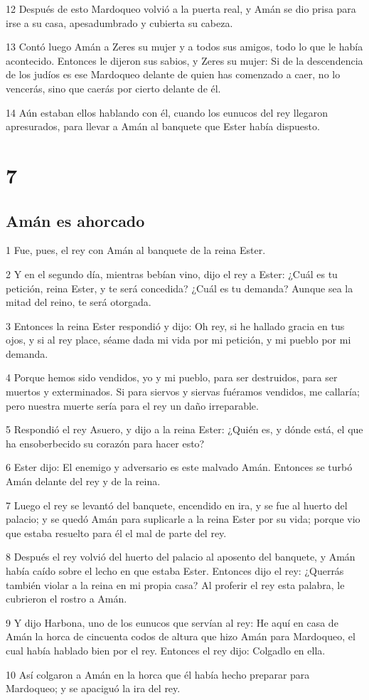 \par 12 Después de esto Mardoqueo volvió a la puerta real, y Amán se dio prisa para irse a su casa, apesadumbrado y cubierta su cabeza.
\par 13 Contó luego Amán a Zeres su mujer y a todos sus amigos, todo lo que le había acontecido. Entonces le dijeron sus sabios, y Zeres su mujer: Si de la descendencia de los judíos es ese Mardoqueo delante de quien has comenzado a caer, no lo vencerás, sino que caerás por cierto delante de él.
\par 14 Aún estaban ellos hablando con él, cuando los eunucos del rey llegaron apresurados, para llevar a Amán al banquete que Ester había dispuesto.

\chapter{7}

\section*{Amán es ahorcado}

\par 1 Fue, pues, el rey con Amán al banquete de la reina Ester.
\par 2 Y en el segundo día, mientras bebían vino, dijo el rey a Ester: ¿Cuál es tu petición, reina Ester, y te será concedida? ¿Cuál es tu demanda? Aunque sea la mitad del reino, te será otorgada.
\par 3 Entonces la reina Ester respondió y dijo: Oh rey, si he hallado gracia en tus ojos, y si al rey place, séame dada mi vida por mi petición, y mi pueblo por mi demanda.
\par 4 Porque hemos sido vendidos, yo y mi pueblo, para ser destruidos, para ser muertos y exterminados. Si para siervos y siervas fuéramos vendidos, me callaría; pero nuestra muerte sería para el rey un daño irreparable.
\par 5 Respondió el rey Asuero, y dijo a la reina Ester: ¿Quién es, y dónde está, el que ha ensoberbecido su corazón para hacer esto?
\par 6 Ester dijo: El enemigo y adversario es este malvado Amán. Entonces se turbó Amán delante del rey y de la reina.
\par 7 Luego el rey se levantó del banquete, encendido en ira, y se fue al huerto del palacio; y se quedó Amán para suplicarle a la reina Ester por su vida; porque vio que estaba resuelto para él el mal de parte del rey.
\par 8 Después el rey volvió del huerto del palacio al aposento del banquete, y Amán había caído sobre el lecho en que estaba Ester. Entonces dijo el rey: ¿Querrás también violar a la reina en mi propia casa? Al proferir el rey esta palabra, le cubrieron el rostro a Amán.
\par 9 Y dijo Harbona, uno de los eunucos que servían al rey: He aquí en casa de Amán la horca de cincuenta codos   de altura que hizo Amán para Mardoqueo, el cual había hablado bien por el rey. Entonces el rey dijo: Colgadlo en ella.
\par 10 Así colgaron a Amán en la horca que él había hecho preparar para Mardoqueo; y se apaciguó la ira del rey.

